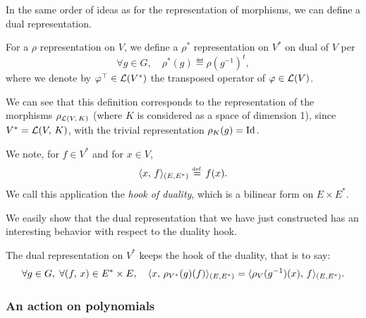    In the same order of ideas as for the representation of morphisms, we can define a dual representation.
 
\begin{defn}
\label{notation-77} \label{notation-78} \label{notation-79} For a $ \rho $ representation on $V$, we define a $ \rho^* $ representation on $ V^* $ on dual of $V$ per
\begin{equation*}
\forall g \in G, \quad \rho^* (g) \eqdef \rho (g^{-1})^{t},
\end{equation*}
where we denote by $ \varphi^\top \in \mathcal{L} (V^*) $ the transposed operator of $ \varphi \in \mathcal{L} (V) $.
\end{defn}
 
 
\begin{rem}
We can see that this definition corresponds to the representation of the morphisms $ \rho_{\mathcal{L} (V, \, K)} $ (where $K$ is considered as a space of dimension 1), since $ V^* = \mathcal{L} (V, \, K) $, with the trivial representation $ \rho_K (g) = \operatorname{Id} $.
\end{rem}
 
 
\begin{defn}
 We note, for $ f \in V^* $ and for $ x \in V $,
\begin{equation*}
\langle x,\,f\rangle_{(E, E^*)} \stackrel{\mbox{\upshape\tiny def.}}{=} f(x).
\end{equation*}
We call this application the \textit{hook of duality}, which is a bilinear form on $ E \times E^* $.
\end{defn}
We easily show that the dual representation that we have just constructed has an interesting behavior with respect to the duality hook.
 
\begin{prop}
The dual representation on $ V^* $ keeps the hook of the duality, that is to say:
\begin{equation*}
\forall g \in G, \; \forall (f, \, x) \in E^* \times E, \quad \langle x,\,\rho_{V^*} (g) (f)\rangle_{(E, E^*)} = \langle \rho_{V} (g^{-1}) (x),\,f\rangle_{(E, E^*)}.
\end{equation*}
\end{prop}
 
\subsubsection{An action on polynomials}
\label{sect3-action-polynomials}
 
